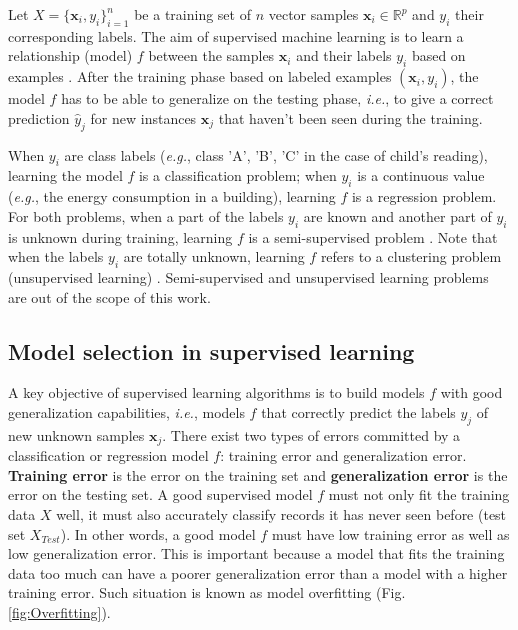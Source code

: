 Let $X=\{\textbf{x}_i,y_i\}_{i=1}^n$ be a training set of $n$ vector samples $\textbf{x}_i \in \mathbb{R}^p$ and $y_i$ their corresponding labels. The aim of supervised machine learning is to learn a relationship (model) $f$ between the samples $\textbf{x}_i$ and their labels $y_i$ based on examples \cite{Bishop2006,Dreyfus2006,Duda1973}. %
After the training phase based on labeled examples $(\textbf{x}_i,y_i)$, the model $f$ has to be able to generalize on the testing phase, \textit{i.e.}, to give a correct prediction $\hat{y}_j$ for new instances $\textbf{x}_j$ that haven't been seen during the training.

When $y_i$ are class labels (\textit{e.g.}, class 'A', 'B', 'C' in the case of child's reading), learning the model $f$ is a classification problem; when $y_i$ is a continuous value (\textit{e.g.}, the energy consumption in a building), learning $f$ is a regression problem. 
For both problems, when a part of the labels $y_i$ are known and another part of $y_i$ is unknown during training, learning $f$ is a semi-supervised problem \cite{Zhu2007}. Note that when the labels $y_i$ are totally unknown, learning $f$ refers to a clustering problem (unsupervised learning) \cite{Jain1999,Chen1996}. Semi-supervised and unsupervised learning problems are out of the scope of this work.



\subsection{Model selection in supervised learning}
\label{sec:model_selection}
A key objective of supervised learning algorithms is to build models $f$ with good generalization capabilities, \textit{i.e.}, models $f$ that correctly predict the labels $y_j$ of new unknown samples $\textbf{x}_j$. There exist two types of errors committed by a classification or regression model $f$: training error and generalization error. \textbf{Training error} is the error on the training set and \textbf{generalization error} is the error on the testing set. A good supervised model $f$ must not only fit the training data $X$ well, it must also accurately classify records it has never seen before (test set $X_{Test}$). In other words, a good model $f$ must have low training error as well as low generalization error. This is important because a model that fits the training data too much can have a poorer generalization error than a model with a higher training error. Such situation is known as model overfitting (Fig. \ref{fig:Overfitting}).

